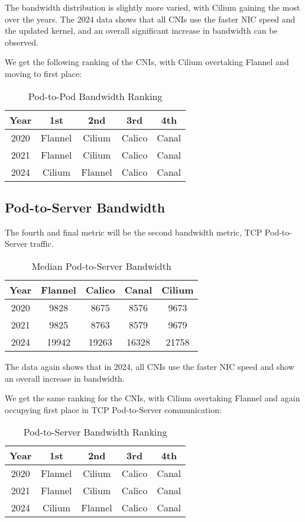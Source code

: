 The bandwidth distribution is slightly more varied, with Cilium gaining the most over the years. The 2024 data shows that all CNIs use the faster NIC speed and the updated kernel, and an overall significant increase in bandwidth can be observed.

We get the following ranking of the CNIs, with Cilium overtaking Flannel and moving to first place:

\begin{table}[H]
\caption{Pod-to-Pod Bandwidth Ranking}
\begin{tabular}{|c | c | c | c | c|} 
 \hline
 Year & 1st & 2nd & 3rd & 4th \\
 \hline\hline
 2020 & Flannel & Cilium & Calico & Canal \\ 
 \hline
 2021 & Flannel & Cilium & Calico & Canal \\
 \hline
 2024 & Cilium & Flannel & Calico & Canal \\
 \hline
\end{tabular}
\label{tab:p2pbw-r}
\end{table}

\subsection{Pod-to-Server Bandwidth}

The fourth and final metric will be the second bandwidth metric, TCP Pod-to-Server traffic.

\begin{table}[H]
\caption{Median Pod-to-Server Bandwidth}
\begin{tabular}{|c | c | c | c | c|} 
 \hline
 Year & Flannel & Calico & Canal & Cilium \\
 \hline\hline
 2020 & 9828 & 8675 & 8576 & 9673 \\ 
 \hline
 2021 & 9825 & 8763 & 8579 & 9679 \\
 \hline
 2024 & 19942 & 19263 & 16328 & 21758 \\
 \hline
\end{tabular}
\label{tab:p2ebw}
\end{table}

The data again shows that in 2024, all CNIs use the faster NIC speed and show an overall increase in bandwidth.

We get the same ranking for the CNIs, with Cilium overtaking Flannel and again occupying first place in TCP Pod-to-Server communication:

\begin{table}[H]
\caption{Pod-to-Server Bandwidth Ranking}
\begin{tabular}{|c | c | c | c | c|} 
 \hline
 Year & 1st & 2nd & 3rd & 4th \\
 \hline\hline
 2020 & Flannel & Cilium & Calico & Canal \\ 
 \hline
 2021 & Flannel & Cilium & Calico & Canal \\
 \hline
 2024 & Cilium & Flannel & Calico & Canal \\
 \hline
\end{tabular}
\label{tab:p2ebw-r}
\end{table}

